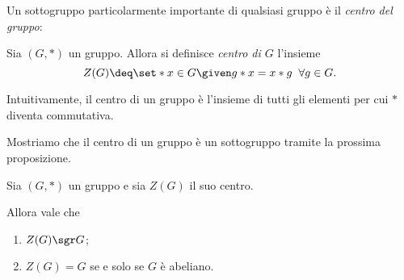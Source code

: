 Un sottogruppo particolarmente importante di qualsiasi gruppo è il \emph{centro del gruppo}:

\begin{definition}
     \label{def:centro}
    Sia $(G, *)$ un gruppo. Allora si definisce \emph{centro di $G$} l'insieme \[
        Z(G) \deq \set*{x \in G \given g*x = x*g \;\;\forall g \in G}.    
    \]
\end{definition}

Intuitivamente, il centro di un gruppo è l'insieme di tutti gli elementi per cui $*$ diventa commutativa.

Mostriamo che il centro di un gruppo è un sottogruppo tramite la prossima proposizione.

\begin{proposition}
    \label{prop:centro}
    Sia $(G, *)$ un gruppo e sia $Z(G)$ il suo centro.

    Allora vale che \begin{enumerate}[label={(\roman*)}, ref={\theproposition: (\roman*)}]
        \item $Z(G) \sgr G$;
        \item $Z(G) = G$ se e solo se $G$ è abeliano.
    \end{enumerate}
\end{proposition}
